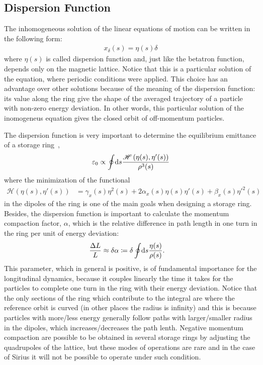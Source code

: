 \subsection{Dispersion Function}

	The inhomogeneous solution of the linear equations of motion can be written in the following form:
	\begin{align}\label{eq:dispersion_function}
		x_\delta(s) = \eta(s)\delta
	\end{align}
	where $\eta(s)$ is called dispersion function and, just like the betatron function, depends only on the magnetic lattice. Notice that this is a particular solution of the equation, where periodic conditions were applied. This choice has an advantage over other solutions because of the meaning of the dispersion function: its value along the ring give the shape of the averaged trajectory of a particle with non-zero energy deviation. In other words, this particular solution of the inomogeneus equation gives the closed orbit of off-momentum particles.

	The dispersion function is very important to determine the equilibrium emittance of a storage ring~\cite[pp. 304]{Wiedemann2007},
    \begin{align}
        \varepsilon_0 \propto \oint\!\text{d}s \frac{\mathscr{H}\left(\eta(s),\eta'(s)\right)}{\rho^3(s)}
    \end{align}
     where the minimization of the functional
	\begin{align}
		\mathscr{H}(\eta(s), \eta'(s)) &= \gamma_x(s)\eta^2(s) +
										2\alpha_x(s)\eta(s)\eta'(s) +
										 \beta_x(s)\eta'^2(s)
	\end{align}
	in the dipoles of the ring is one of the main goals when designing a storage ring. Besides, the dispersion function is important to calculate the momentum compaction factor, $\alpha$, which is the relative difference in path length in one turn in the ring per unit of energy deviation:
	\begin{align}\label{eq:momentum_compaction}
		\frac{\Delta L}{L} &\approx \delta \alpha \coloneqq \delta \oint\!\text{d}s \frac{\eta(s)}{\rho(s)}.
	\end{align}
	This parameter, which in general is positive, is of fundamental importance for the longitudinal dynamics, because it couples linearly the time it takes for the particles to complete one turn in the ring with their energy deviation. Notice that the only sections of the ring which contribute to the integral are where the reference orbit is curved (in other places the radius is infinity) and this is because particles with more/less energy generally follow paths with larger/smaller radius in the dipoles, which increases/decreases the path lenth. Negative momentum compaction are possible to be obtained in several storage rings by adjusting the quadrupoles of the lattice, but these modes of operations are rare and in the case of Sirius it will not be possible to operate under such condition.

